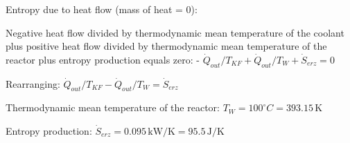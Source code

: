 Entropy due to heat flow (mass of heat = 0):  

Negative heat flow divided by thermodynamic mean temperature of the coolant plus positive heat flow divided by thermodynamic mean temperature of the reactor plus entropy production equals zero:  
- \( \dot{Q}_{out} / T_{KF} + \dot{Q}_{out} / T_{W} + \dot{S}_{erz} = 0 \)  

Rearranging:  
\( \dot{Q}_{out} / T_{KF} - \dot{Q}_{out} / T_{W} = \dot{S}_{erz} \)  

Thermodynamic mean temperature of the reactor:  
\( T_{W} = 100^\circ C = 393.15 \, \text{K} \)  

Entropy production:  
\( \dot{S}_{erz} = 0.095 \, \text{kW/K} = 95.5 \, \text{J/K} \)